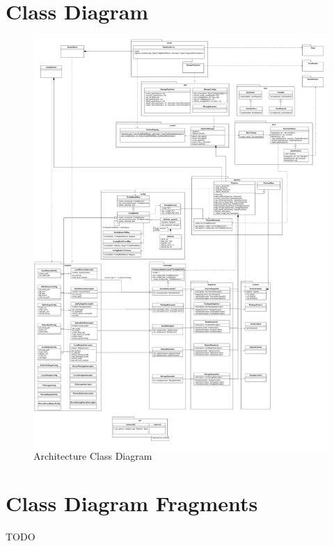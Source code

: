   \section{Class Diagram}
    \begin{figure}[H]
        \hspace{-4em}
        \includegraphics[width = 1.2\linewidth]{diagrams/architecture_classes.png}
        \caption{Architecture Class Diagram}
        \label{fig:architecture_classes}
      \end{figure}

    \section{Class Diagram Fragments}
    TODO


